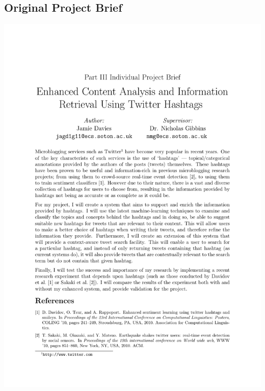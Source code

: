\documentclass[11pt,a4paper]{report}
\begin{document}
\begin{subappendices}
\section{Original Project Brief}
\begin{center}\includegraphics[trim=2.5cm 2.5cm 2.5cm 3.5cm,clip,width=\textwidth]{../brief/brief.pdf}\end{center}
\end{subappendices}
\end{document}
